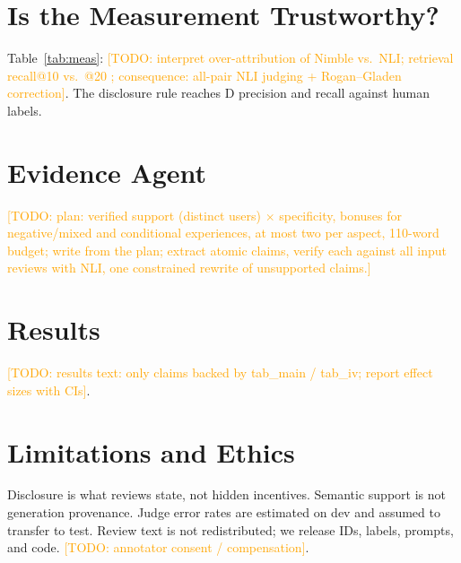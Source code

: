 \documentclass[sigconf,anonymous,review]{acmart}
\newcommand{\todo}[1]{\textcolor{orange}{[TODO: #1]}}
\begin{document}
\section{Is the Measurement Trustworthy?}
\begin{table}[t]\centering\small
\caption{Evidence judges vs.\ human pair labels (dev; sampling-weighted).}\label{tab:meas}

\end{table}
Table~\ref{tab:meas}: \todo{interpret over-attribution of Nimble vs.\ NLI; retrieval recall@10
\retRecallTen{} vs.\ @20 \retRecallTwenty{}; consequence: all-pair NLI judging + Rogan--Gladen correction}.
The disclosure rule reaches D precision  and recall  against human labels.

\section{Evidence Agent}
\todo{plan: verified support (distinct users) $\times$ specificity, bonuses for negative/mixed and
conditional experiences, at most two per aspect, 110-word budget; write from the plan; extract atomic
claims, verify each against all input reviews with NLI, one constrained rewrite of unsupported claims.}

\section{Results}
\begin{table}[t]\centering\small
\caption{Test results. Rec.$_{gold}$: recall of human important experiences; Rec.$_{agreed}$: only
experiences found by both annotators; $\Delta$: paired product bootstrap vs.\ B0; Supp.$_{corr}$:
human-calibrated pair support rate.}\label{tab:main}

\end{table}
\begin{table}[t]\centering\small
\caption{Controlled real-review interventions.}\label{tab:iv}

\end{table}
\todo{results text: only claims backed by tab\_main / tab\_iv; report effect sizes with CIs}.

\section{Limitations and Ethics}
Disclosure is what reviews state, not hidden incentives. Semantic support is not generation provenance.
Judge error rates are estimated on dev and assumed to transfer to test. Review text is not
redistributed; we release IDs, labels, prompts, and code. \todo{annotator consent / compensation}.



\end{document}
